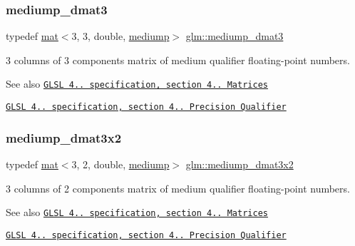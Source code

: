 \subsubsection{\texorpdfstring{mediump\+\_\+dmat3}{mediump\_dmat3}}
{\footnotesize\ttfamily typedef \mbox{\hyperlink{structglm_1_1mat}{mat}}$<$3, 3, double, \mbox{\hyperlink{namespaceglm_a36ed105b07c7746804d7fdc7cc90ff25a6416f3ea0c9025fb21ed50c4d6620482}{mediump}}$>$ \mbox{\hyperlink{group__core__precision_gaf1be0a781d33d2450a31e64e09d8d18f}{glm\+::mediump\+\_\+dmat3}}}

3 columns of 3 components matrix of medium qualifier floating-\/point numbers.

\begin{DoxySeeAlso}{See also}
\href{http://www.opengl.org/registry/doc/GLSLangSpec.4.20.8.pdf}{\tt G\+L\+SL 4.. specification, section 4.. Matrices} 

\href{http://www.opengl.org/registry/doc/GLSLangSpec.4.20.8.pdf}{\tt G\+L\+SL 4.. specification, section 4.. Precision Qualifier} 
\end{DoxySeeAlso}
\mbox{\label{group__core__precision_gaefc11f3917dc7882f4399a47393792fa}} 
\subsubsection{\texorpdfstring{mediump\+\_\+dmat3x2}{mediump\_dmat3x2}}
{\footnotesize\ttfamily typedef \mbox{\hyperlink{structglm_1_1mat}{mat}}$<$3, 2, double, \mbox{\hyperlink{namespaceglm_a36ed105b07c7746804d7fdc7cc90ff25a6416f3ea0c9025fb21ed50c4d6620482}{mediump}}$>$ \mbox{\hyperlink{group__core__precision_gaefc11f3917dc7882f4399a47393792fa}{glm\+::mediump\+\_\+dmat3x2}}}

3 columns of 2 components matrix of medium qualifier floating-\/point numbers.

\begin{DoxySeeAlso}{See also}
\href{http://www.opengl.org/registry/doc/GLSLangSpec.4.20.8.pdf}{\tt G\+L\+SL 4.. specification, section 4.. Matrices} 

\href{http://www.opengl.org/registry/doc/GLSLangSpec.4.20.8.pdf}{\tt G\+L\+SL 4.. specification, section 4.. Precision Qualifier} 
\end{DoxySeeAlso}
\mbox{\label{group__core__precision_ga8ecaed5443b0aa73bbe8683fcbb04f65}} 
